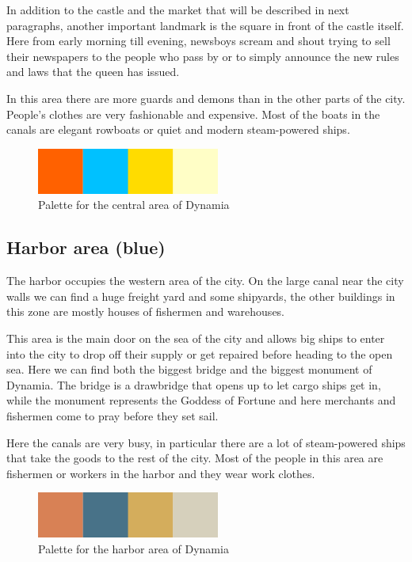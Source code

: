 In addition to the castle and the market that will be described in next paragraphs, another important landmark is the square in front of the castle itself. Here from early morning till evening, newsboys scream and shout trying to sell their newspapers to the people who pass by or to simply announce the new rules and laws that the queen has issued.

In this area there are more guards and demons than in the other parts of the city. People's clothes are very fashionable and expensive. Most of the boats in the canals are elegant rowboats or quiet and modern steam-powered ships.

\begin{figure}[H]
  \centering
  \includegraphics[width=6cm]{Images/Palettes/dynamiaCentralArea}
  \caption{Palette for the central area of Dynamia}
\end{figure}

\subsection{Harbor area (blue)}
The harbor occupies the western area of the city. On the large canal near the city walls we can find a huge freight yard and some shipyards, the  other buildings in this zone are mostly houses of fishermen and warehouses.

This area is the main door on the sea of the city and allows big ships to enter into the city to drop off their supply or get repaired before heading to the open sea. Here we can find both the biggest bridge and the biggest monument of Dynamia. The bridge is a drawbridge that opens up to let cargo ships get in, while the monument represents the Goddess of Fortune and here merchants and fishermen come to pray before they set sail.

Here the canals are very busy, in particular there are a lot of steam-powered ships that take the goods to the rest of the city. Most of the people in this area are fishermen or workers in the harbor and they wear work clothes.

\begin{figure}[H]
  \centering
  \includegraphics[width=6cm]{Images/Palettes/dynamiaHarborArea}
  \caption{Palette for the harbor area of Dynamia}
\end{figure}

